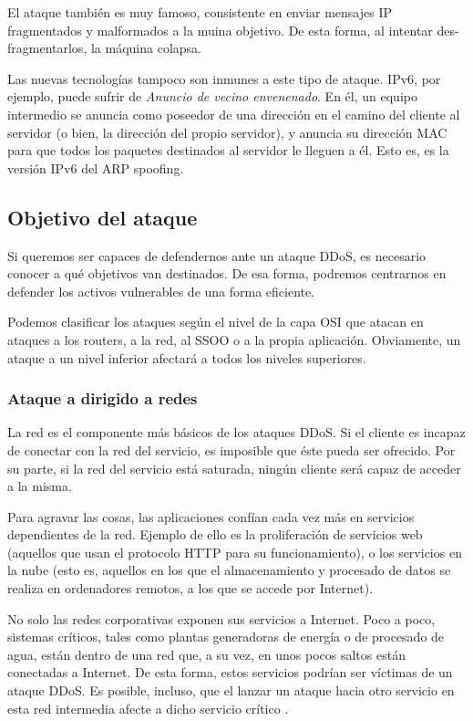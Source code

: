 El ataque \emph{} también es muy famoso, consistente en enviar mensajes IP fragmentados y malformados a 
la muina objetivo. De esta forma, al intentar des-fragmentarlos, la máquina colapsa.

Las nuevas tecnologías tampoco son inmunes a este tipo de ataque. IPv6, por ejemplo, puede sufrir de \emph{Anuncio de 
vecino envenenado}. En él, un equipo intermedio se anuncia como poseedor 
de una dirección en el camino del cliente al servidor (o bien, la dirección del propio servidor), y anuncia su 
dirección MAC para que todos los paquetes destinados al servidor le lleguen a él. Esto es, es la versión IPv6 del ARP 
spoofing.

\subsection{Objetivo del ataque}
Si queremos ser capaces de defendernos ante un ataque DDoS, es necesario conocer a qué objetivos van destinados. De esa 
forma, podremos centrarnos en defender los activos vulnerables de una forma eficiente.

Podemos clasificar los ataques según el nivel de la capa OSI que atacan en ataques a los routers, a la red, al SSOO o a 
la propia aplicación. Obviamente, un ataque a un nivel inferior afectará a todos los niveles superiores.

\subsubsection{Ataque a dirigido a redes}
La red es el componente más básicos de los ataques DDoS. Si el cliente es incapaz de conectar con la red del servicio, 
es imposible que éste pueda ser ofrecido. Por su parte, si la red del servicio está saturada, ningún cliente será capaz 
de acceder a la misma.

Para agravar las cosas, las aplicaciones confían cada vez más en servicios dependientes de la red. Ejemplo de ello es 
la proliferación de servicios web (aquellos que usan el protocolo \acrshort{HTTP} para su 
funcionamiento), o los servicios en la nube (esto es, aquellos en los que el almacenamiento 
y procesado de datos se realiza en ordenadores remotos, a los que se accede por Internet). 

No solo las redes corporativas exponen sus servicios a Internet. Poco a poco, sistemas críticos, tales como plantas 
generadoras de energía o de procesado de agua, están dentro de una red que, a su vez, en unos pocos saltos están 
conectadas a Internet. De esta forma, estos servicios podrían ser víctimas de un ataque DDoS. Es posible, incluso, que 
el lanzar un ataque hacia otro servicio en esta red intermedia afecte a dicho servicio crítico \cite{Raghavan}.

